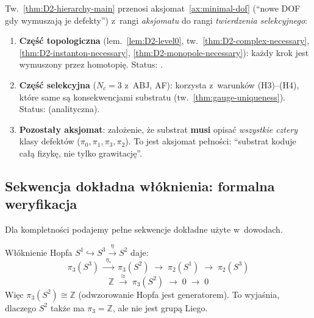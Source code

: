\begin{remark}%
\label{rem:D2-axiom-status}
Tw.~\ref{thm:D2-hierarchy-main} przenosi aksjomat~\ref{ax:minimal-dof}
(``nowe DOF gdy wymuszaj\k{a} je defekty'') z~rangi \emph{aksjomatu}
do rangi \emph{twierdzenia selekcyjnego}:

\begin{enumerate}[nosep]
  \item \textbf{Cz\k{e}\'s\'c topologiczna} (lem.~\ref{lem:D2-level0},
    tw.~\ref{thm:D2-complex-necessary}, \ref{thm:D2-instanton-necessary},
    \ref{thm:D2-monopole-necessary}): ka\.zdy krok jest
    wymuszony przez homotopi\k{e}. Status: .
  \item \textbf{Cz\k{e}\'s\'c selekcyjna} ($N_c = 3$ z~ABJ, AF):
    korzysta z~warunk\'ow (H3)--(H4), kt\'ore same s\k{a}
    konsekwencjami substratu (tw.~\ref{thm:gauge-uniqueness}).
    Status:  (analityczna).
  \item \textbf{Pozosta\l{}y aksjomat}: za\l{}o\.zenie, \.ze
    substrat \textbf{musi} opisa\'c \emph{wszystkie cztery}
    klasy defekt\'ow ($\pi_0, \pi_1, \pi_3, \pi_2$).
    To jest aksjomat pe\l{}no\'sci: ``substrat koduje ca\l{}\k{a}
    fizyk\k{e}, nie tylko grawitacj\k{e}''.
\end{enumerate}
\end{remark}

\subsection{Sekwencja dok\l{}adna w\l{}\'oknienia: formalna weryfikacja}%
\label{ssec:D2-fibration}

Dla kompletno\'sci podajemy pe\l{}ne sekwencje dok\l{}adne
u\.zyte w~dowodach.

\begin{lemma}\label{lem:D2-hopf}
W\l{}\'oknienie Hopfa $S^1 \hookrightarrow S^3
\xrightarrow{\;\eta\;} S^2$ daje:
\[
  \pi_3(S^3) \;\xrightarrow{\;\eta_*\;}\; \pi_3(S^2)
  \;\to\; \pi_2(S^1) \;\to\; \pi_2(S^3)
\]
\[
  \mathbb{Z} \;\xrightarrow{\;\cong\;}\; \pi_3(S^2)
  \;\to\; 0 \;\to\; 0
\]
Wi\k{e}c $\pi_3(S^2) \cong \mathbb{Z}$ (odwzorowanie Hopfa
jest generatorem). To wyja\'snia, dlaczego $S^2$ tak\.ze
ma $\pi_3 = \mathbb{Z}$, ale nie jest grup\k{a} Liego.
\end{lemma}


